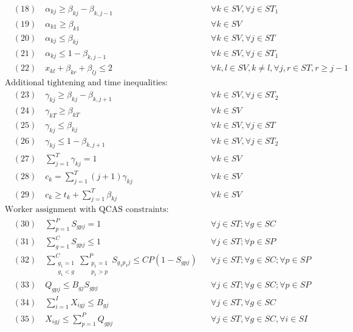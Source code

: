 \documentclass[11pt]{ctexart}
\begin{document}
\begin{align*}
& \quad (18) \quad \alpha_{kj} \ge \beta_{kj} - \beta_{k, j-1} && \forall k \in SV, \forall j \in ST_1 \\
& \quad (19) \quad \alpha_{k1} \ge \beta_{k1} && \forall k \in SV \\
& \quad (20) \quad \alpha_{kj} \le \beta_{kj} && \forall k \in SV, \forall j \in ST \\
& \quad (21) \quad \alpha_{kj} \le 1 - \beta_{k, j-1} && \forall k \in SV, \forall j \in ST_1 \\
& \quad (22) \quad x_{kl} + \beta_{kr} + \beta_{lj} \le 2 && \forall k, l \in SV, k \neq l, \forall j, r \in ST, r \ge j-1 \\
& \text{Additional tightening and time inequalities:} \\
& \quad (23) \quad \gamma_{kj} \ge \beta_{kj} - \beta_{k, j+1} && \forall k \in SV, \forall j \in ST_2 \\
& \quad (24) \quad \gamma_{kT} \ge \beta_{kT} && \forall k \in SV \\
& \quad (25) \quad \gamma_{kj} \le \beta_{kj} && \forall k \in SV, \forall j \in ST \\
& \quad (26) \quad \gamma_{kj} \le 1 - \beta_{k, j+1} && \forall k \in SV, \forall j \in ST_2 \\
& \quad (27) \quad \sum_{j=1}^{T} \gamma_{kj} = 1 && \forall k \in SV \\
& \quad (28) \quad c_k = \sum_{j=1}^{T} (j+1) \gamma_{kj} && \forall k \in SV \\
& \quad (29) \quad c_k \ge t_k + \sum_{j=1}^{T} \beta_{kj} && \forall k \in SV \\
& \text{Worker assignment with QCAS constraints:} \\
& \quad (30) \quad \sum_{p=1}^{P} S_{gpj} = 1 && \forall j \in ST; \forall g \in SC \\
& \quad (31) \quad \sum_{g=1}^{C} S_{gpj} \le 1 && \forall j \in ST; \forall p \in SP \\
& \quad (32) \quad \sum_{\substack{g_1=1 \\ g_1<g}}^{C} \sum_{\substack{p_1=1 \\ p_1>p}}^{P} S_{g_1 p_1 j} \le CP(1 - S_{gpj}) && \forall j \in ST; \forall g \in SC; \forall p \in SP \\
& \quad (33) \quad Q_{gpj} \le B_{gj} S_{gpj} && \forall j \in ST; \forall g \in SC; \forall p \in SP \\
& \quad (34) \quad \sum_{i=1}^{I} X_{igj} \le B_{gj} && \forall j \in ST, \forall g \in SC \\
& \quad (35) \quad X_{igj} \le \sum_{p=1}^{P} Q_{gpj} && \forall j \in ST, \forall g \in SC, \forall i \in SI \\

\end{align*}
\end{document}
